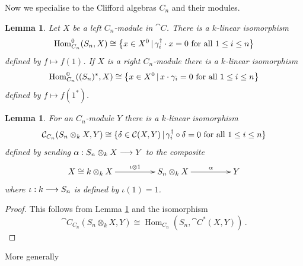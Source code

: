 \documentclass[english,letter paper,12pt,leqno]{article}
\newtheorem{lemma}[theorem]{Lemma}
\theoremstyle{example}
\numberwithin{equation}{section}
\def\Hom{\operatorname{Hom}}
\begin{document}
Now we specialise to the Clifford algebras $C_n$ and their modules.

\begin{lemma}\label{lemma:simplehom} Let $X$ be a left $C_n$-module in $\cat{C}$. There is a $k$-linear isomorphism
\[
\Hom_{C_n}^0( S_n, X ) \cong \big\{ x \in X^0 \l \gamma_i^\dagger \cdot x = 0 \text{ for all } 1 \le i \le n \big\}
\]
defined by $f \mapsto f(1)$. If $X$ is a right $C_n$-module there is a $k$-linear isomorphism
\[
\Hom^0_{C_n}( (S_n)^*, X ) \cong \big\{ x \in X^0 \l x \cdot \gamma_i = 0 \text{ for all } 1 \le i \le n \big\}
\]
defined by $f \mapsto f(1^*)$.
\end{lemma}

\begin{lemma}\label{lemma:morphism_out_1} For an $C_n$-module $Y$ there is a $k$-linear isomorphism
\[
\mathcal{C}_{C_n}( S_n \otimes_k X, Y ) \cong \{ \delta \in \mathcal{C}(X,Y) \,|\, \gamma_i^\dagger \circ \delta = 0 \text{ for all } 1 \le i \le n \}
\]
defined by sending $\alpha: S_n \otimes_k X \longrightarrow Y$ to the composite
\[
\xymatrix@C+2pc{
X \cong k \otimes_k X \ar[r]^-{\iota \otimes 1} & S_n \otimes_k X \ar[r]^-{\alpha} & Y
}
\]
where $\iota: k \longrightarrow S_n$ is defined by $\iota(1) = 1$.
\end{lemma}
\begin{proof}
This follows from Lemma \ref{lemma:simplehom} and the isomorphism
\[
\cat{C}_{C_n}(S_n \otimes_k X, Y ) \cong \Hom_{C_n}( S_n, \cat{C}^*(X,Y) )\,.
\]
\end{proof}

More generally
\end{document}
